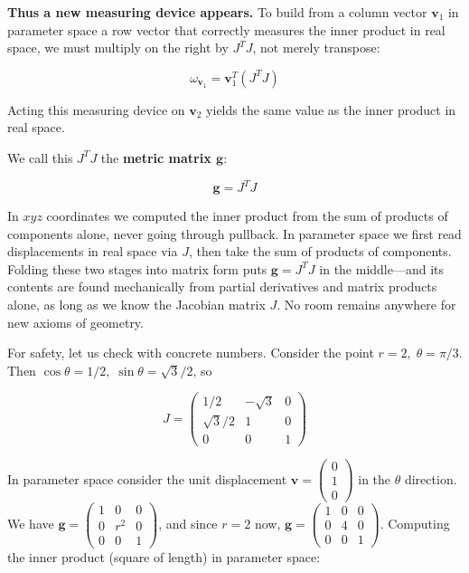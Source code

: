 \documentclass[a4paper,12pt,openany]{book}
\begin{document}
\textbf{Thus a new measuring device appears.} To build from a column
vector \(\mathbf{v}_1\) in parameter space a row vector that correctly
measures the inner product in real space, we must multiply on the right
by \(J^T J\), not merely transpose:

\[\omega_{\mathbf{v}_1} = \mathbf{v}_1^T (J^T J)\]

Acting this measuring device on \(\mathbf{v}_2\) yields the same value
as the inner product in real space.

We call this \(J^T J\) the \textbf{metric matrix $\mathbf{g}$}:

\[\mathbf{g} = J^T J\]

In \(xyz\) coordinates we computed the inner product from the sum of
products of components alone, never going through pullback. In parameter
space we first read displacements in real space via \(J\), then take the
sum of products of components. Folding these two stages into matrix form
puts \(\mathbf{g}=J^T J\) in the middle—and its contents are found
mechanically from partial derivatives and matrix products alone, as long
as we know the Jacobian matrix \(J\). No room remains anywhere for new
axioms of geometry.

For safety, let us check with concrete numbers. Consider the point
\(r=2,\; \theta=\pi/3\). Then
\(\cos\theta = 1/2,\; \sin\theta = \sqrt{3}/2\), so

\[J = \begin{pmatrix}
1/2 & -\sqrt{3} & 0 \\
\sqrt{3}/2 & 1 & 0 \\
0 & 0 & 1
\end{pmatrix}\]

In parameter space consider the unit displacement
\(\mathbf{v} = \begin{pmatrix}0 \\ 1 \\ 0\end{pmatrix}\) in the
\(\theta\) direction. We have
\(\mathbf{g} = \begin{pmatrix} 1 & 0 & 0 \\ 0 & r^2 & 0 \\ 0 & 0 & 1 \end{pmatrix}\),
and since \(r=2\) now,
\(\mathbf{g} = \begin{pmatrix} 1 & 0 & 0 \\ 0 & 4 & 0 \\ 0 & 0 & 1 \end{pmatrix}\).
Computing the inner product (square of length) in parameter space:
\end{document}
